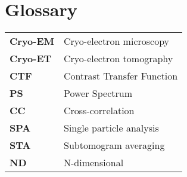 \chapter{Glossary}

\renewcommand{\arraystretch}{1.5}

\begin{tabularx}{\linewidth}{>{\bf}l X}
Cryo-EM & Cryo-electron microscopy \\
Cryo-ET & Cryo-electron tomography \\
CTF & Contrast Transfer Function \\
PS & Power Spectrum \\
CC & Cross-correlation \\
SPA & Single particle analysis \\
STA & Subtomogram averaging \\
ND & N-dimensional \\
\end{tabularx}

